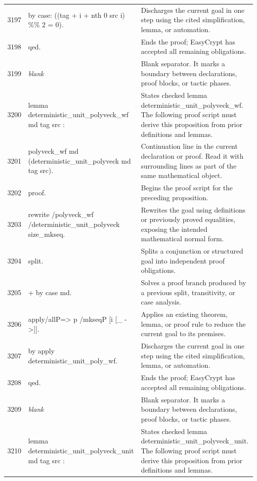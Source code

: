\documentclass[10pt]{article}
\begin{document}
\begin{longtable}{r L{0.53\textwidth} L{0.37\textwidth}}
3197 & {\ttfamily\scriptsize by case: ((tag + i + nth 0 src i) \%\% 2 = 0).} & Discharges the current goal in one step using the cited simplification, lemma, or automation. \\
3198 & {\ttfamily\scriptsize qed.} & Ends the proof; EasyCrypt has accepted all remaining obligations. \\
3199 & {\ttfamily\scriptsize \emph{blank}} & Blank separator.  It marks a boundary between declarations, proof blocks, or tactic phases. \\
3200 & {\ttfamily\scriptsize lemma deterministic\_unit\_polyveck\_wf md tag src :} & States checked lemma deterministic\_unit\_polyveck\_wf.  The following proof script must derive this proposition from prior definitions and lemmas. \\
3201 & {\ttfamily\scriptsize   polyveck\_wf md (deterministic\_unit\_polyveck md tag src).} & Continuation line in the current declaration or proof.  Read it with surrounding lines as part of the same mathematical object. \\
3202 & {\ttfamily\scriptsize proof.} & Begins the proof script for the preceding proposition. \\
3203 & {\ttfamily\scriptsize rewrite /polyveck\_wf /deterministic\_unit\_polyveck size\_mkseq.} & Rewrites the goal using definitions or previously proved equalities, exposing the intended mathematical normal form. \\
3204 & {\ttfamily\scriptsize split.} & Splits a conjunction or structured goal into independent proof obligations. \\
3205 & {\ttfamily\scriptsize + by case md.} & Solves a proof branch produced by a previous split, transitivity, or case analysis. \\
3206 & {\ttfamily\scriptsize apply/allP=> p /mkseqP [i [\_ ->]].} & Applies an existing theorem, lemma, or proof rule to reduce the current goal to its premises. \\
3207 & {\ttfamily\scriptsize by apply deterministic\_unit\_poly\_wf.} & Discharges the current goal in one step using the cited simplification, lemma, or automation. \\
3208 & {\ttfamily\scriptsize qed.} & Ends the proof; EasyCrypt has accepted all remaining obligations. \\
3209 & {\ttfamily\scriptsize \emph{blank}} & Blank separator.  It marks a boundary between declarations, proof blocks, or tactic phases. \\
3210 & {\ttfamily\scriptsize lemma deterministic\_unit\_polyveck\_unit md tag src :} & States checked lemma deterministic\_unit\_polyveck\_unit.  The following proof script must derive this proposition from prior definitions and lemmas. \\

\end{longtable}
\end{document}
